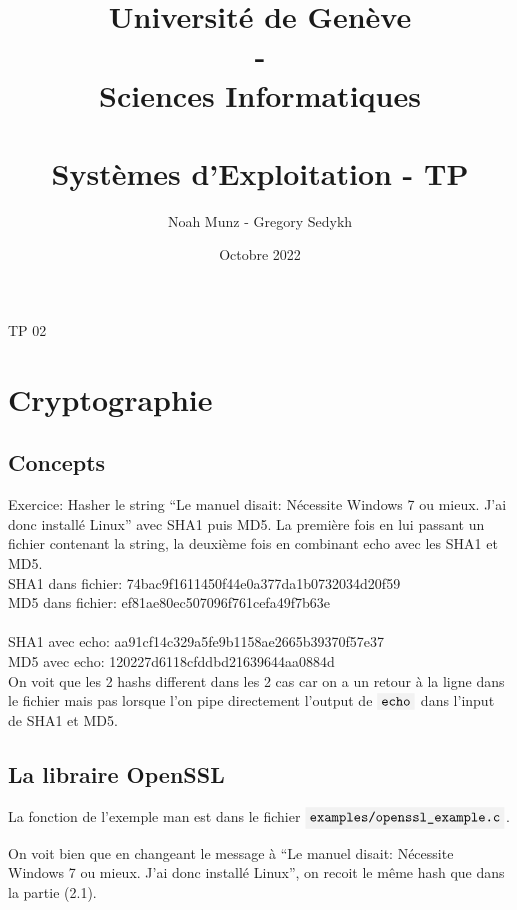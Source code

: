 \documentclass[french]{article}
\title{
   {\huge Université de Genève \\ - \\ Sciences Informatiques} \\
    \vspace{0.6cm}
    \unilogo{0.41} \\ 
    \vspace{1.1cm}
    {\huge Systèmes d'Exploitation - TP \nb}
    \vspace{0.1cm}
}
\author{Noah Munz - Gregory Sedykh}
\date{Octobre 2022}
\newcommand{\code}[1]{$\mbox{\colorbox{light-gray}{\texttt{#1}}}$}
\newcommand{\quo}[1]{``{#1}''}
\newcommand{\nb}{02}
\begin{document}
%
\maketitle
\thispagestyle{empty}
\clearpage
\setcounter{page}{1}
%
%
\begin{center}
{\huge TP \nb}
\end{center}
\vspace{0.2cm}
%
\section{Cryptographie}
%
\vspace{0.3cm}
\subsection{Concepts}
Exercice: Hasher le string \quo{Le manuel disait: Nécessite Windows 7 ou mieux. J'ai donc installé Linux} avec SHA1 puis MD5.
La première fois en lui passant un fichier contenant la string, la deuxième fois en combinant echo avec les SHA1 et MD5.\\


SHA1 dans fichier: 74bac9f1611450f44e0a377da1b0732034d20f59\\
MD5 dans fichier: ef81ae80ec507096f761cefa49f7b63e
\\
\\SHA1 avec echo: aa91cf14c329a5fe9b1158ae2665b39370f57e37
\\MD5 avec echo: 120227d6118cfddbd21639644aa0884d\\

On voit que les 2 hashs different dans les 2 cas car on a un retour à la ligne dans le fichier mais pas lorsque l'on pipe directement l'output de \code{echo} dans l'input de SHA1 et MD5.

%
\vspace{0.3cm}
\subsection{La libraire OpenSSL}

La fonction de l'exemple man est dans le fichier \code{examples/openssl\_example.c}.

On voit bien que en changeant le message à \quo{Le manuel disait: Nécessite Windows 7 ou mieux. J'ai donc installé Linux}, on recoit le même hash que dans la partie (2.1).
%

%
%
\vspace{0.3cm}
\end{document}
